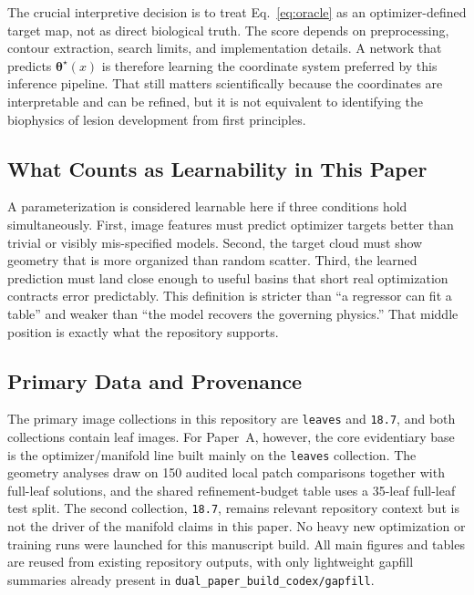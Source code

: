\documentclass[11pt,a4paper]{article}
\newcommand{\thetao}{\boldsymbol{\theta}^{\star}}
\begin{document}
The crucial interpretive decision is to treat Eq.~\eqref{eq:oracle} as an optimizer-defined target map, not as direct biological truth.
The score depends on preprocessing, contour extraction, search limits, and implementation details.
A network that predicts $\thetao(x)$ is therefore learning the coordinate system preferred by this inference pipeline.
That still matters scientifically because the coordinates are interpretable and can be refined, but it is not equivalent to identifying the biophysics of lesion development from first principles.

\subsection{What Counts as Learnability in This Paper}
A parameterization is considered learnable here if three conditions hold simultaneously.
First, image features must predict optimizer targets better than trivial or visibly mis-specified models.
Second, the target cloud must show geometry that is more organized than random scatter.
Third, the learned prediction must land close enough to useful basins that short real optimization contracts error predictably.
This definition is stricter than ``a regressor can fit a table'' and weaker than ``the model recovers the governing physics.''
That middle position is exactly what the repository supports.

\subsection{Primary Data and Provenance}
The primary image collections in this repository are \texttt{leaves} and \texttt{18.7}, and both collections contain leaf images.
For Paper~A, however, the core evidentiary base is the optimizer/manifold line built mainly on the \texttt{leaves} collection.
The geometry analyses draw on 150 audited local patch comparisons together with full-leaf solutions, and the shared refinement-budget table uses a 35-leaf full-leaf test split.
The second collection, \texttt{18.7}, remains relevant repository context but is not the driver of the manifold claims in this paper.
No heavy new optimization or training runs were launched for this manuscript build.
All main figures and tables are reused from existing repository outputs, with only lightweight gapfill summaries already present in \texttt{dual\_paper\_build\_codex/gapfill}.
\end{document}
